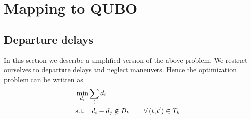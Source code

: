 \section{Mapping to QUBO}

\subsection{Departure delays}
\label{sec:departure_delay_model}
In this section we describe a simplified version of the above problem.
We restrict ourselves to departure delays and neglect maneuvers.
Hence the optimization problem can be written as
\begin{align}
    & \min_{d_i} \sum_i d_i \notag \\
    & \text{s.t.}  \quad 
    d_i - d_j \notin D_k \qquad \forall \, (t, t') \in T_k \label{eqn:departure_delay_model}
\end{align}

